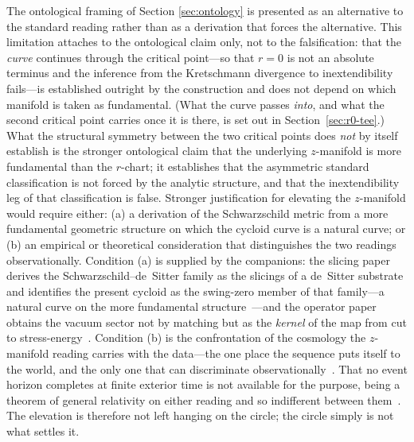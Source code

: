 \documentclass[11pt,a4paper]{article}
\theoremstyle{definition}
\begin{document}
The ontological framing of Section \ref{sec:ontology} is presented as an alternative to the standard reading rather than as a derivation that forces the alternative. This limitation attaches to the ontological claim only, not to the falsification: that the \emph{curve} continues through the critical point---so that $r=0$ is not an absolute terminus and the inference from the Kretschmann divergence to inextendibility fails---is established outright by the construction and does not depend on which manifold is taken as fundamental. (What the curve passes \emph{into}, and what the second critical point carries once it is there, is set out in Section~\ref{sec:r0-tee}.) What the structural symmetry between the two critical points does \emph{not} by itself establish is the stronger ontological claim that the underlying $z$-manifold is more fundamental than the $r$-chart; it establishes that the asymmetric standard classification is not forced by the analytic structure, and that the inextendibility leg of that classification is false. Stronger justification for elevating the $z$-manifold would require either: (a) a derivation of the Schwarzschild metric from a more fundamental geometric structure on which the cycloid curve is a natural curve; or (b) an empirical or theoretical consideration that distinguishes the two readings observationally. Condition (a) is supplied by the companions: the slicing paper derives the Schwarzschild--de~Sitter family as the slicings of a de~Sitter substrate and identifies the present cycloid as the swing-zero member of that family---a natural curve on the more fundamental structure~\cite{JanzenSlicing}---and the operator paper obtains the vacuum sector not by matching but as the \emph{kernel} of the map from cut to stress-energy~\cite{JanzenOperator}. Condition (b) is the confrontation of the cosmology the $z$-manifold reading carries with the data---the one place the sequence puts itself to the world, and the only one that can discriminate observationally~\cite{JanzenCRcosmology,JanzenCosmogenesis}. That no event horizon completes at finite exterior time is not available for the purpose, being a theorem of general relativity on either reading and so indifferent between them~\cite{JanzenBHcausality}. The elevation is therefore not left hanging on the circle; the circle simply is not what settles it.
\end{document}
